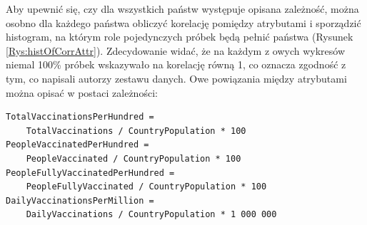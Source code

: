 \documentclass[12pt, oneside]{article}
\begin{document}
\newpage
Aby upewnić się, czy dla wszystkich państw występuje opisana zależność, można osobno dla każdego państwa obliczyć korelację pomiędzy atrybutami i sporządzić histogram, na którym role pojedynczych próbek będą pełnić państwa (Rysunek \ref{Rys:histOfCorrAttr}). Zdecydowanie widać, że na każdym z owych wykresów niemal 100\% próbek wskazywało na korelację równą 1, co oznacza zgodność z tym, co napisali autorzy zestawu danych. Owe powiązania między atrybutami można opisać w postaci zależności:

\begin{Verbatim}[tabsize=4]
TotalVaccinationsPerHundred = 
	TotalVaccinations / CountryPopulation * 100
PeopleVaccinatedPerHundred = 
	PeopleVaccinated / CountryPopulation * 100
PeopleFullyVaccinatedPerHundred = 
	PeopleFullyVaccinated / CountryPopulation * 100
DailyVaccinationsPerMillion = 
	DailyVaccinations / CountryPopulation * 1 000 000
\end{Verbatim}
\end{document}
